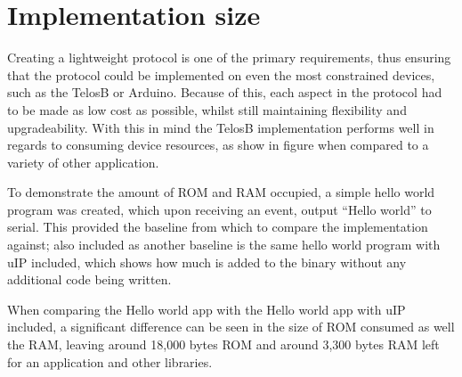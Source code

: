 
\section{Implementation size} %
\label{sec:implementation_size_and_performance}
Creating a lightweight protocol is one of the primary requirements, thus ensuring that the protocol could be implemented on even the most constrained devices, such as the TelosB or Arduino. Because of this, each aspect in the protocol had to be made as low cost as possible, whilst still maintaining flexibility and upgradeability. With this in mind the TelosB implementation performs well in regards to consuming device resources, as show in figure \cite{size} when compared to a variety of other application.

To demonstrate the amount of ROM and RAM occupied, a simple hello world program was created, which upon receiving an event, output ``Hello world'' to serial. This provided the baseline from which to compare the implementation against; also included as another baseline is the same hello world program with uIP included, which shows how much is added to the binary without any additional code being written.

When comparing the Hello world app with the Hello world app with uIP included, a significant difference can be seen in the size of ROM consumed as well the RAM, leaving around 18,000 bytes ROM and around 3,300 bytes RAM left for an application and other libraries.

